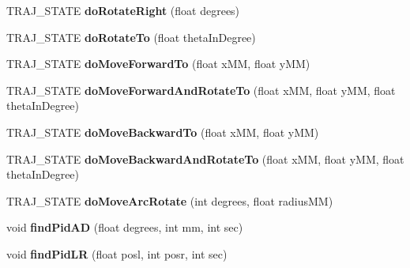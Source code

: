\begin{DoxyCompactItemize}
\item 
\mbox{\label{classAPF9328AsservExtended_a583f946694acc9c6615df591521104b1}} 
T\+R\+A\+J\+\_\+\+S\+T\+A\+TE {\bfseries do\+Rotate\+Right} (float degrees)
\item 
\mbox{\label{classAPF9328AsservExtended_a0f9168a280e268b56cb60342c6fce860}} 
T\+R\+A\+J\+\_\+\+S\+T\+A\+TE {\bfseries do\+Rotate\+To} (float theta\+In\+Degree)
\item 
\mbox{\label{classAPF9328AsservExtended_a35c5019f69bb53cb9600f209be2631f6}} 
T\+R\+A\+J\+\_\+\+S\+T\+A\+TE {\bfseries do\+Move\+Forward\+To} (float x\+MM, float y\+MM)
\item 
\mbox{\label{classAPF9328AsservExtended_a232fb3f6155d9ca47ad1a5fa84f864ee}} 
T\+R\+A\+J\+\_\+\+S\+T\+A\+TE {\bfseries do\+Move\+Forward\+And\+Rotate\+To} (float x\+MM, float y\+MM, float theta\+In\+Degree)
\item 
\mbox{\label{classAPF9328AsservExtended_ae3c617b710adf712035fa980c76c9401}} 
T\+R\+A\+J\+\_\+\+S\+T\+A\+TE {\bfseries do\+Move\+Backward\+To} (float x\+MM, float y\+MM)
\item 
\mbox{\label{classAPF9328AsservExtended_aff286213f4d9d7be855a74c8c7363543}} 
T\+R\+A\+J\+\_\+\+S\+T\+A\+TE {\bfseries do\+Move\+Backward\+And\+Rotate\+To} (float x\+MM, float y\+MM, float theta\+In\+Degree)
\item 
\mbox{\label{classAPF9328AsservExtended_a66bed45318b698cb8b01189e0bc7bd7a}} 
T\+R\+A\+J\+\_\+\+S\+T\+A\+TE {\bfseries do\+Move\+Arc\+Rotate} (int degrees, float radius\+MM)
\item 
\mbox{\label{classAPF9328AsservExtended_a71871107ef45ada828c09f296f7c4825}} 
void {\bfseries find\+Pid\+AD} (float degrees, int mm, int sec)
\item 
\mbox{\label{classAPF9328AsservExtended_aa9ebc38ac7438566d3a609d6953e08c1}} 
void {\bfseries find\+Pid\+LR} (float posl, int posr, int sec)

\end{DoxyCompactItemize}

